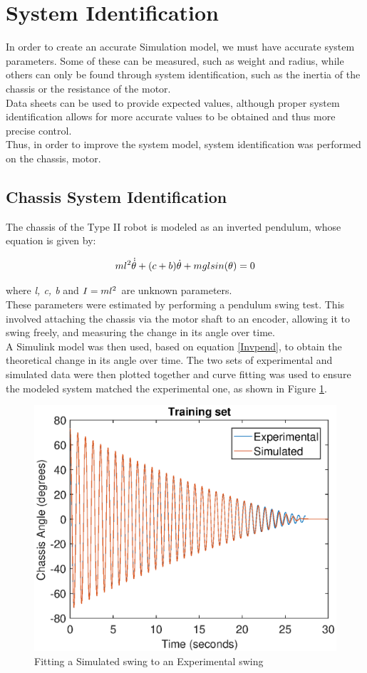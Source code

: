 \documentclass{UoNMCHA}
\numberwithin{equation}{section}
\begin{document}
\newpage
\section{System Identification}\label{SysID}

In order to create an accurate Simulation model, we must have accurate system parameters. Some of these can be measured, such as weight and radius, while others can only be found through system identification, such as the inertia of the chassis or the resistance of the motor. \\
 Data sheets can be used to provide expected values, although proper system identification  allows for more accurate values to be obtained and thus more precise control.\\
Thus, in order to improve the system model, system identification was performed on the chassis, motor.

\subsection{Chassis System Identification}

The chassis of the Type II robot is modeled as an inverted pendulum, whose equation is given by:

\begin{equation}\label{Invpend}
	ml\textsuperscript{2}\dot{\dot{\theta}} + (c+b)\dot{\theta} + mglsin(\theta) = 0
\end{equation}

where \textit{l, c, b} and $I= ml\textsuperscript{2}$ are unknown parameters. \\

These parameters were estimated by performing a pendulum swing test. This involved attaching the chassis via the motor shaft to an encoder, allowing it to swing freely, and measuring the change in its angle over time.\\
A Simulink model was then used, based on equation \ref{Invpend}, to obtain the theoretical change in its angle over time. The two sets of experimental and simulated data were then plotted together and curve fitting was used to ensure the modeled system matched the experimental one, as shown in Figure \ref{training}.

\begin{figure}[!h]
	\begin{center}
		\includegraphics[width=.6\linewidth]{figs/trainingset}
		\caption{Fitting a Simulated swing to an Experimental swing}
		\label{training}
	\end{center}
\end{figure}
\end{document}

